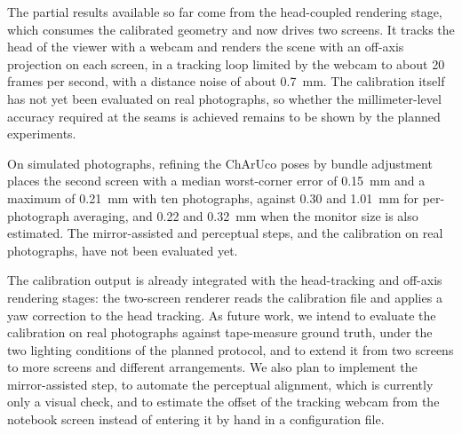 \documentclass[english,hidelinks]{sbrt}
\begin{document}
The partial results available so far come from the head-coupled rendering stage, which consumes the calibrated geometry and now drives two screens. It tracks the head of the viewer with a webcam and renders the scene with an off-axis projection on each screen, in a tracking loop limited by the webcam to about 20 frames per second, with a distance noise of about 0.7~mm. The calibration itself has not yet been evaluated on real photographs, so whether the millimeter-level accuracy required at the seams is achieved remains to be shown by the planned experiments.

On simulated photographs, refining the ChArUco poses by bundle adjustment places the second screen with a median worst-corner error of 0.15~mm and a maximum of 0.21~mm with ten photographs, against 0.30 and 1.01~mm for per-photograph averaging, and 0.22 and 0.32~mm when the monitor size is also estimated. The mirror-assisted and perceptual steps, and the calibration on real photographs, have not been evaluated yet.

The calibration output is already integrated with the head-tracking and off-axis rendering stages: the two-screen renderer reads the calibration file and applies a yaw correction to the head tracking. As future work, we intend to evaluate the calibration on real photographs against tape-measure ground truth, under the two lighting conditions of the planned protocol, and to extend it from two screens to more screens and different arrangements. We also plan to implement the mirror-assisted step, to automate the perceptual alignment, which is currently only a visual check, and to estimate the offset of the tracking webcam from the notebook screen instead of entering it by hand in a configuration file.



\end{document}
